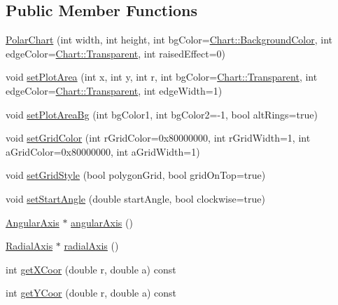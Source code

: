 \subsection*{Public Member Functions}
\begin{DoxyCompactItemize}
\item 
\hyperlink{class_polar_chart_a7269b9fccbcc87f5590c6310b67b195b}{Polar\+Chart} (int width, int height, int bg\+Color=\hyperlink{namespace_chart_abee0d882fdc9ad0b001245ad9fc64011a134193bde693b9d152d0c6dc59fa7d7f}{Chart\+::\+Background\+Color}, int edge\+Color=\hyperlink{namespace_chart_abee0d882fdc9ad0b001245ad9fc64011afc6811800a9e2582dac0157b6279f836}{Chart\+::\+Transparent}, int raised\+Effect=0)
\item 
void \hyperlink{class_polar_chart_adc36a42598e36330c451bab063739494}{set\+Plot\+Area} (int x, int y, int r, int bg\+Color=\hyperlink{namespace_chart_abee0d882fdc9ad0b001245ad9fc64011afc6811800a9e2582dac0157b6279f836}{Chart\+::\+Transparent}, int edge\+Color=\hyperlink{namespace_chart_abee0d882fdc9ad0b001245ad9fc64011afc6811800a9e2582dac0157b6279f836}{Chart\+::\+Transparent}, int edge\+Width=1)
\item 
void \hyperlink{class_polar_chart_a4bb79336412c5a0407ca057713926ac8}{set\+Plot\+Area\+Bg} (int bg\+Color1, int bg\+Color2=-\/1, bool alt\+Rings=true)
\item 
void \hyperlink{class_polar_chart_a781271d5381dfe4fe6164384ebbed7a1}{set\+Grid\+Color} (int r\+Grid\+Color=0x80000000, int r\+Grid\+Width=1, int a\+Grid\+Color=0x80000000, int a\+Grid\+Width=1)
\item 
void \hyperlink{class_polar_chart_a088600a8966e89904181d33842077e15}{set\+Grid\+Style} (bool polygon\+Grid, bool grid\+On\+Top=true)
\item 
void \hyperlink{class_polar_chart_a46183032bdf951a3b7b940c38aceb30a}{set\+Start\+Angle} (double start\+Angle, bool clockwise=true)
\item 
\hyperlink{class_angular_axis}{Angular\+Axis} $\ast$ \hyperlink{class_polar_chart_ab8bf9e2fdc266ee0e8a5e878e3e80cde}{angular\+Axis} ()
\item 
\hyperlink{chartdir_8h_a4e17084867bb8e096e6e13b956e538ce}{Radial\+Axis} $\ast$ \hyperlink{class_polar_chart_ab29bc179de261a048e3c493324ff85f1}{radial\+Axis} ()
\item 
int \hyperlink{class_polar_chart_a948b023559d129d515adf187526262eb}{get\+X\+Coor} (double r, double a) const
\item 
int \hyperlink{class_polar_chart_a1f64ec407df2fdd1c80bbc7fd9fb018b}{get\+Y\+Coor} (double r, double a) const

\end{DoxyCompactItemize}
